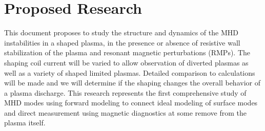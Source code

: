 \documentclass[aps,prl,twocolumn,superscriptaddress,groupedaddress]{revtex4}  %
\begin{document}
\section{Proposed Research}
	This document proposes to study the structure and dynamics of the MHD instabilities in a shaped plasma, in the presence or absence of resistive wall  stabilization of the plasma and resonant magnetic perturbations (RMPs).  The shaping coil current will be varied to allow observation of diverted plasmas as well as a variety of shaped limited plasmas.  Detailed comparison to calculations will be made and we will determine if the shaping changes the overall behavior of a plasma discharge.  This research represents the first comprehensive study of MHD modes using forward modeling to connect ideal modeling of surface modes and direct measurement using magnetic diagnostics at some remove from the plasma itself.\par
\end{document}
